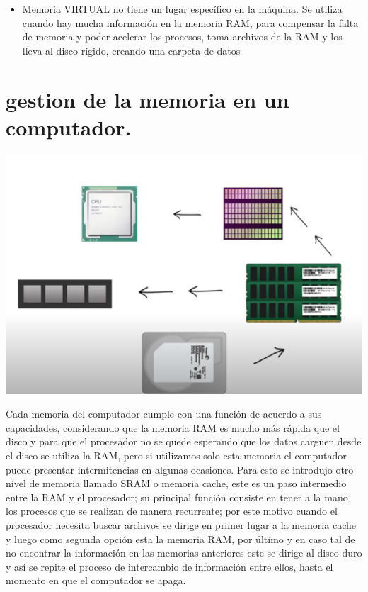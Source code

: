 \documentclass[12pt]{report}
\begin{document}
\begin{itemize}
         \item { Memoria VIRTUAL} no tiene un lugar específico en la máquina. 
        Se utiliza  cuando hay mucha información en la memoria RAM, para compensar la falta de memoria y poder acelerar los procesos, toma archivos de la RAM y los lleva al disco rígido, creando una carpeta de datos 


 \cite{tipos}
 \cite{memoria}


\end{itemize}





\section{gestion de la memoria en un computador.} 

\includegraphics[width=1.00\textwidth]{imagen 2.PNG}
\vspace{0.1cm}

Cada memoria del computador cumple con una función de acuerdo a sus capacidades, considerando que la memoria RAM es mucho más rápida que el disco  y para que el procesador no se quede esperando que los datos carguen desde el disco se utiliza la RAM, pero si utilizamos solo esta memoria el computador puede presentar intermitencias  en algunas ocasiones. Para esto se introdujo otro nivel de memoria llamado SRAM o memoria cache, este es un paso intermedio entre la RAM y el procesador; su principal función consiste en tener a la mano los procesos que se realizan de manera recurrente; por este motivo cuando  el procesador necesita buscar archivos se dirige en primer lugar a la memoria cache  y luego como segunda opción esta la memoria RAM, por último y en caso tal de no encontrar la información en las memorias anteriores este se dirige al disco duro y así se repite el proceso de intercambio de información entre ellos, hasta el momento en que el computador se apaga.
\end{document}
